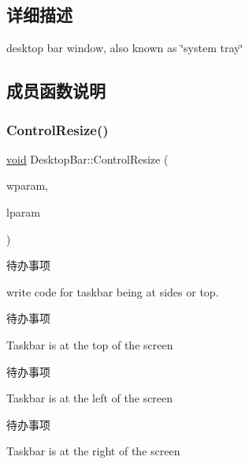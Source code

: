\subsection{详细描述}
desktop bar window, also known as \char`\"{}system tray\char`\"{} 

\subsection{成员函数说明}
\mbox{\label{struct_desktop_bar_a47e1906c84e318b43d8e33bf141a4ea6}} 
\subsubsection{\texorpdfstring{Control\+Resize()}{ControlResize()}}
{\footnotesize\ttfamily \hyperlink{interfacevoid}{void} Desktop\+Bar\+::\+Control\+Resize (\begin{DoxyParamCaption}\item[{W\+P\+A\+R\+AM}]{wparam,  }\item[{L\+P\+A\+R\+AM}]{lparam }\end{DoxyParamCaption})\hspace{0.3cm}{\ttfamily [protected]}}

\begin{DoxyRefDesc}{待办事项}
\item[\hyperlink{todo__todo000055}{待办事项}]write code for taskbar being at sides or top. \end{DoxyRefDesc}


\begin{DoxyRefDesc}{待办事项}
\item[\hyperlink{todo__todo000056}{待办事项}]Taskbar is at the top of the screen \end{DoxyRefDesc}


\begin{DoxyRefDesc}{待办事项}
\item[\hyperlink{todo__todo000057}{待办事项}]Taskbar is at the left of the screen \end{DoxyRefDesc}


\begin{DoxyRefDesc}{待办事项}
\item[\hyperlink{todo__todo000058}{待办事项}]Taskbar is at the right of the screen \end{DoxyRefDesc}
\mbox{\label{struct_desktop_bar_ad78702ec191b91c67e845ea72978e241}} 
